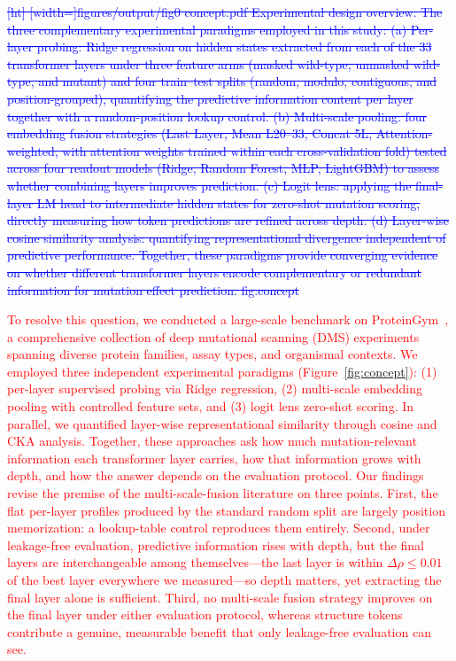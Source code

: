\documentclass[11pt,a4paper]{article}
\newcommand{\rev}[1]{\textcolor{red}{#1}}
\begin{document}
\textcolor{blue}{\sout{[ht]
[width=]figures/output/fig0 concept.pdf
Experimental design overview.
The three complementary experimental paradigms employed in this study:
(a) Per-layer probing: Ridge regression on hidden states extracted from each
of the 33 transformer layers under three feature arms (masked wild-type,
unmasked wild-type, and mutant) and four train--test splits (random, modulo,
contiguous, and position-grouped), quantifying the predictive information content per
layer together with a random-position lookup control.
(b) Multi-scale pooling: four embedding fusion strategies (Last Layer,
Mean L20--33, Concat 5L, Attention-weighted, with attention weights trained
within each cross-validation fold) tested across four readout models
(Ridge, Random Forest, MLP, LightGBM) to assess whether combining layers improves
prediction.
(c) Logit lens: applying the final-layer LM head to intermediate hidden
states for zero-shot mutation scoring, directly measuring how token predictions
are refined across depth.
(d) Layer-wise cosine similarity analysis: quantifying representational
divergence independent of predictive performance.
Together, these paradigms provide converging evidence on whether different
transformer layers encode complementary or redundant information for mutation
effect prediction.
fig:concept}}

\textcolor{red}{To resolve this question, we conducted a large-scale benchmark on ProteinGym~\cite{notin2024proteingym},
a comprehensive collection of deep mutational scanning (DMS) experiments spanning
diverse protein families, assay types, and organismal contexts. We employed
three independent experimental paradigms (Figure~\ref{fig:concept}): (1) per-layer supervised probing via Ridge
regression, (2) multi-scale embedding pooling with controlled feature sets, and
(3) logit lens zero-shot scoring. In parallel, we quantified layer-wise representational
similarity through cosine and CKA analysis. Together, these approaches ask how
much mutation-relevant information each transformer layer carries, how that
information grows with depth, and how the answer depends on the evaluation
protocol. \rev{Our findings revise the premise of the multi-scale-fusion
literature on three points. First, the flat per-layer profiles produced by the
standard random split are largely position memorization: a lookup-table control
reproduces them entirely. Second, under leakage-free evaluation, predictive
information rises with depth, but the final layers are interchangeable among
themselves---the last layer is within $\Delta\rho \leq 0.01$ of the best layer
everywhere we measured---so depth matters, yet extracting the final layer alone
is sufficient. Third, no multi-scale fusion strategy improves on the final
layer under either evaluation protocol, whereas structure tokens contribute a
genuine, measurable benefit that only leakage-free evaluation can see.}}
\end{document}
